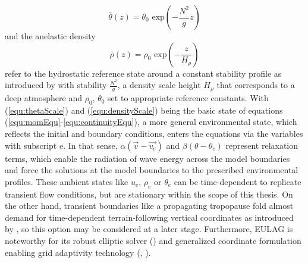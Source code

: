 %
\begin{equation}
    \bar{\theta}(z) = \theta_0 \textrm{ exp}(-\frac{N^2}{g} z) 
    \label{equ:thetaScale}
\end{equation}
%
and the anelastic density 
%
\begin{equation}
    \bar{\rho}(z) = \rho_0 \textrm{ exp}(-\frac{z}{H_{\rho}})
    \label{equ:densityScale}
\end{equation}
refer to the hydrostatic reference state around a constant stability profile as introduced by \textcite{bacmeister_breakdown_1989} with stability $\frac{N^2}{g}$, a density scale height $H_{\rho}$ that corresponds to a deep atmosphere and $\rho_0$, $\theta_0$ set to appropriate reference constants. With (\ref{equ:thetaScale}) and (\ref{equ:densityScale}) being the basic state of equations (\ref{equ:momEqu}-\ref{equ:continuityEqu}), a more general environmental state, which reflects the initial and boundary conditions, enters the equations via the variables with subscript e. In that sense, $\alpha(\Vec{v}-\Vec{v_e})$ and $\beta(\theta-\theta_e)$ represent relaxation terms, which enable the radiation of wave energy across the model boundaries and force the solutions at the model boundaries to the prescribed environmental profiles. These ambient states like $u_e$, $\rho_e$ or $\theta_e$ can be time-dependent to replicate transient flow conditions, but are stationary within the scope of this thesis. On the other hand, transient boundaries like a propagating tropopause fold almost demand for time-dependent terrain-following vertical coordinates as introduced by \textcite{wedi_extending_2003}, so this option may be considered at a later stage. Furthermore, EULAG is noteworthy for its robust elliptic solver (\cite{smolarkiewicz_forward--time_1993}) and generalized coordinate formulation enabling grid adaptivity technology (\cite{prusa_eulag_2008}, \cite{kuhnlein_modelling_2012}).

